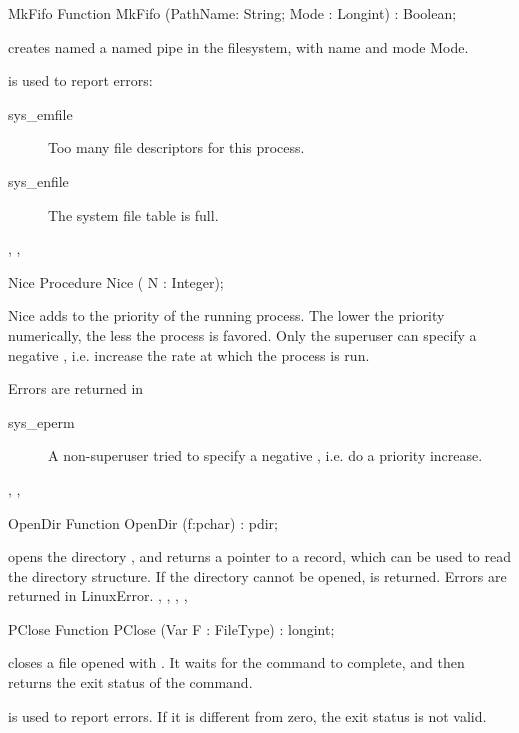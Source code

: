 \latex{}
\html{}
\begin{function}{MkFifo}
\Declaration
Function MkFifo (PathName: String; Mode : Longint) : Boolean;

\Description
{} creates named a named pipe in the filesystem, with name
 and mode {Mode}. 

\Errors
  is used to report errors:
\begin{description}
\item[sys\_emfile] Too many file descriptors for this process.
\item[sys\_enfile] The system file table is full.
\end{description}

\SeeAlso
{}, , 
\end{function}
\begin{procedure}{Nice}
\Declaration
Procedure Nice ( N : Integer);

\Description
Nice adds  to the priority of the running process. The lower the
priority numerically, the less the process is favored.
Only the superuser can specify a negative , i.e. increase the rate at
which the process is run.

\Errors
 Errors are returned in 
\begin{description}
\item [sys\_eperm] A non-superuser tried to specify a negative , i.e.
do a priority increase.
\end{description}

\SeeAlso
{}, , 
\end{procedure}
\latex{}
\html{}
\begin{function}{OpenDir}
\Declaration
Function OpenDir (f:pchar) : pdir;

\Description
  opens the directory  , and returns a 
pointer to a  record, which can be used to read the directory 
structure. If the directory cannot be opened,  is returned.
\Errors
Errors are returned in LinuxError.
\SeeAlso
{}, , , ,
\end{function}
\latex{}
\html{}
\begin{function}{PClose}
\Declaration
Function PClose (Var F : FileType) : longint;

\Description
  closes a file opened with . It waits for the
command to complete, and then returns the exit status of the command. 

\Errors
{} is used to report errors. If it is different from zero,
the exit status is not valid.
\SeeAlso
{}
\end{function}
